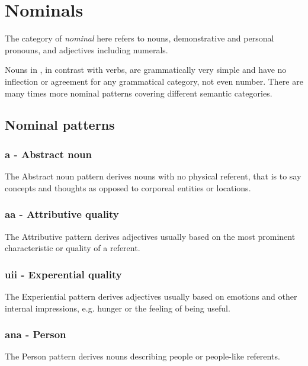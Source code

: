 \chapter{Nominals}

The category of \textit{nominal} here refers to nouns, demonstrative and personal pronouns, and adjectives including numerals.

Nouns in \lang{}, in contrast with verbs, are grammatically very simple and have no inflection or agreement for any grammatical category, not even number. There are many times more nominal patterns covering different semantic categories.

\section{Nominal patterns}


\subsection{\rootpart{}a\rootpart{} - Abstract noun}

The Abstract noun pattern derives nouns with no physical referent, that is to say concepts and thoughts as opposed to corporeal entities or locations.

\subsection{\rootpart{}a\rootpart{}a - Attributive quality}

The Attributive pattern derives adjectives usually based on the most prominent characteristic or quality of a referent.

\subsection{u\rootpart{}i\rootpart{}i - Experential quality}

The Experiential pattern derives adjectives usually based on emotions and other internal impressions, e.g. hunger or the feeling of being useful.

\subsection{\rootpart{}ana\rootpart{} - Person}

The Person pattern derives nouns describing people or people-like referents.


